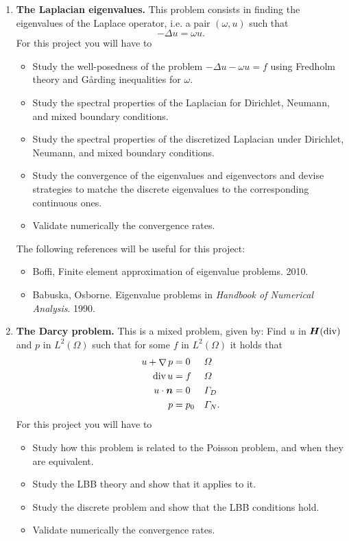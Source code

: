 \documentclass{article}
\renewcommand{\vec}{\vectorsym}
\DeclareMathOperator{\grad}{\nabla}
\DeclareMathOperator{\dive}{\text{div}}
\begin{document}
\begin{enumerate}
    \item \textbf{The Laplacian eigenvalues.} This problem consists in finding the eigenvalues of the Laplace operator, i.e. a pair $(\omega, u)$ such that
        $$-\Delta u = \omega u.$$
        For this project you will have to 
        \begin{itemize}
            \item Study the well-posedness of the problem $-\Delta u - \omega u = f$ using Fredholm theory and G\r arding inequalities for $\omega$.
            \item Study the spectral properties of the Laplacian for Dirichlet, Neumann, and mixed boundary conditions.
            \item Study the spectral properties of the discretized Laplacian under Dirichlet, Neumann, and mixed boundary conditions.
            \item Study the convergence of the eigenvalues and eigenvectors and devise strategies to matche the discrete eigenvalues to the corresponding continuous ones.
            \item Validate numerically the convergence rates.
        \end{itemize}
        The following references will be useful for this project:
        \begin{itemize}
            \item Boffi, Finite element approximation of eigenvalue problems. 2010.
            \item Babuska, Osborne. Eigenvalue problems in \emph{Handbook of Numerical Analysis}. 1990.
        \end{itemize}

    \item \textbf{The Darcy problem.} This is a mixed problem, given by: Find $u$ in $\vec H(\dive)$ and $p$ in $L^2(\Omega)$ such that for some $f$ in $L^2(\Omega)$ it holds that
        $$ \begin{aligned}
            u + \grad p &= 0 && \Omega \\
            \dive u     &= f && \Omega \\
            u\cdot \vec n &= 0 && \Gamma_D \\
            p           &= p_0 && \Gamma_N.
        \end{aligned} $$
        For this project you will have to 
        \begin{itemize}
            \item Study how this problem is related to the Poisson problem, and when they are equivalent.
            \item Study the LBB theory and show that it applies to it.
            \item Study the discrete problem and show that the LBB conditions hold.
            \item Validate numerically the convergence rates.
        \end{itemize}


\end{enumerate}
\end{document}
